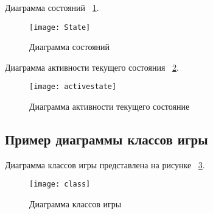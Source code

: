 Диаграмма состояний ~\ref{State:image}.
\begin{figure}[H]
	\texttt{[image: State]}
	\caption{Диаграмма состояний}
	\label{State:image}
\end{figure}

Диаграмма активности текущего состояния ~\ref{activestate:image}.
\begin{figure}[H]
	\texttt{[image: activestate]}
	\caption{Диаграмма активности текущего состояние}
	\label{activestate:image}
\end{figure}
		
				
\subsection{Пример диаграммы классов игры}

Диаграмма классов игры представлена на рисунке ~\ref{class:image}.
\begin{figure}[H]
	\texttt{[image: class]}
	\caption{Диаграмма классов игры}
	\label{class:image}
\end{figure}

 
